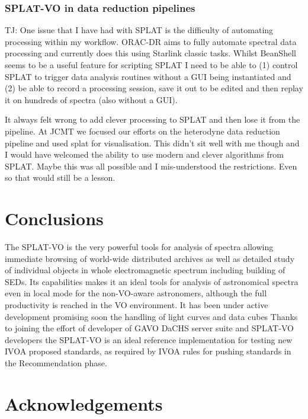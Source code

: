 \documentclass[final,authoryear,5p,times,twocolumn]{elsarticle}
\begin{document}
\subsubsection{SPLAT-VO in data reduction pipelines}

{\color{red}

TJ: One issue that I have had with SPLAT is the difficulty of
automating processing within my workflow. ORAC-DR aims to fully
automate spectral data processing and currently does this using
Starlink classic tasks. Whilst BeanShell seems to be a useful feature
for scripting SPLAT I need to be able to (1) control SPLAT to trigger data
analysis routines without a GUI being instantiated and (2) be able to
record a processing session, save it out to be edited and then replay
it on hundreds of spectra (also without a GUI).

It always felt wrong to add clever processing to SPLAT and then lose
it from the pipeline. At JCMT we focused our efforts on the heterodyne
data reduction pipeline and used splat for visualisation. This didn't
sit well with me though and I would have welcomed the ability to use
modern and clever algorithms from SPLAT. Maybe this was all possible
and I mis-understood the restrictions. Even so that would still be a lesson.

}

\section{Conclusions}

The SPLAT-VO is the very powerful tools for analysis of spectra
allowing immediate browsing of world-wide distributed archives as well
as detailed study of individual objects in whole electromagnetic
spectrum including building of SEDs. Its capabilities makes it an
ideal tools for analysis of astronomical spectra even in local mode
for the non-VO-aware astronomers, although the full productivity is
reached in the VO environment.  It has been under active development
promising soon the handling of light curves and data cubes Thanks to
joining the effort of developer of GAVO DaCHS server suite and
SPLAT-VO developers the SPLAT-VO is an ideal reference implementation
for testing new IVOA proposed standards, as required by IVOA rules for
pushing standards in the Recommendation phase.

\section*{Acknowledgements}
\end{document}
